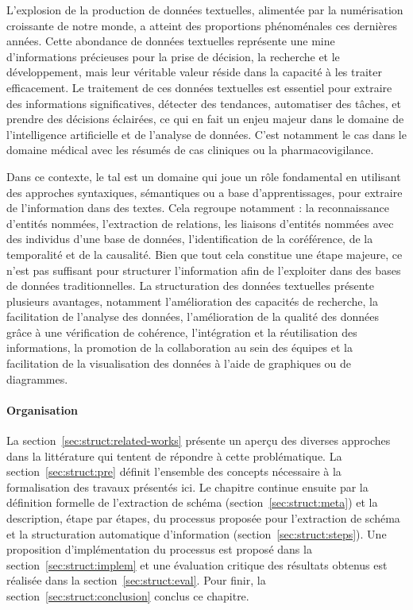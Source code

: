 L'explosion de la production de données textuelles, alimentée par la numérisation croissante de notre monde, a atteint des proportions phénoménales ces dernières années.
Cette abondance de données textuelles représente une mine d'informations précieuses pour la prise de décision, la recherche et le développement, mais leur véritable valeur réside dans la capacité à les traiter efficacement.
Le traitement de ces données textuelles est essentiel pour extraire des informations significatives, détecter des tendances, automatiser des tâches, et prendre des décisions éclairées, ce qui en fait un enjeu majeur dans le domaine de l'intelligence artificielle et de l'analyse de données.
C'est notamment le cas dans le domaine médical avec les résumés de cas cliniques ou la pharmacovigilance.

Dans ce contexte, le \gls{tal} est un domaine qui joue un rôle fondamental en utilisant des approches syntaxiques, sémantiques ou a base d'apprentissages, pour extraire de l'information dans des textes.
Cela regroupe notamment : la reconnaissance d'entités nommées, l'extraction de relations, les liaisons d'entités nommées avec des individus d'une base de données, l'identification de la coréférence, de la temporalité et de la causalité.
Bien que tout cela constitue une étape majeure, ce n'est pas suffisant pour structurer l'information afin de l'exploiter dans des bases de données traditionnelles.
La structuration des données textuelles présente plusieurs avantages, notamment l'amélioration des capacités de recherche, la facilitation de l'analyse des données, l'amélioration de la qualité des données grâce à une vérification de cohérence, l'intégration et la réutilisation des informations, la promotion de la collaboration au sein des équipes et la facilitation de la visualisation des données à l'aide de graphiques ou de diagrammes.

\paragraph{Organisation}
La section~\ref{sec:struct:related-works} présente un aperçu des diverses approches dans la littérature qui tentent de répondre à cette problématique.
La section~\ref{sec:struct:pre} définit l'ensemble des concepts nécessaire à la formalisation des travaux présentés ici.
Le chapitre continue ensuite par la définition formelle de l'extraction de schéma (section~\ref{sec:struct:meta}) et la description, étape par étapes, du processus proposée pour l'extraction de schéma et la structuration automatique d'information (section~\ref{sec:struct:steps}).
Une proposition d'implémentation du processus est proposé dans la section~\ref{sec:struct:implem} et une évaluation critique des résultats obtenus est réalisée dans la section~\ref{sec:struct:eval}.
Pour finir, la section~\ref{sec:struct:conclusion} conclus ce chapitre.


